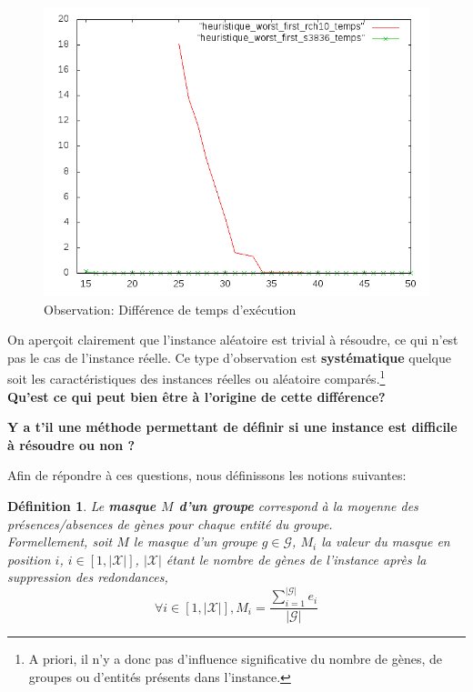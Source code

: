 \documentclass[a4paper,12pt]{article}
\newtheorem{definition}{Définition}
\begin{document}
\begin{figure}[H]
\begin{center}
\includegraphics[scale=0.6]{./graphique/observation_temps.png}
\end{center}
\caption{Observation: Différence de temps d'exécution}
\end{figure}

On aperçoit clairement que l'instance aléatoire est trivial à résoudre, ce qui n'est pas le cas de l'instance réelle. Ce type d'observation est \textbf{systématique} quelque soit les caractéristiques des instances réelles ou aléatoire comparés.\footnote{A priori, il n'y a donc pas d'influence significative du nombre de gènes, de groupes ou d'entités présents dans l'instance.}\\

\textbf{Qu'est ce qui peut bien être à l'origine de cette différence?}

\textbf{Y a t'il une méthode permettant de définir si une instance est difficile à résoudre ou non ?}

Afin de répondre à ces questions, nous définissons les notions suivantes:

\begin{definition}
Le \textbf{masque $M$ d'un groupe} correspond à la moyenne des présences/absences de gènes pour chaque entité du groupe.\\
Formellement, soit $M$ le masque d'un groupe $g \in \mathcal{G}$, $M_i$ la valeur du masque en position $i$, $i \in [1,|\mathcal{X}|]$, $|\mathcal{X}|$ étant le nombre de gènes de l'instance après la suppression des redondances,
$$\forall i \in  [1, |\mathcal{X}|], M_i= \frac{\sum_{i=1}^{|\mathcal{G}|}e_i}{|\mathcal{G}|} $$
\end{definition}
\end{document}
